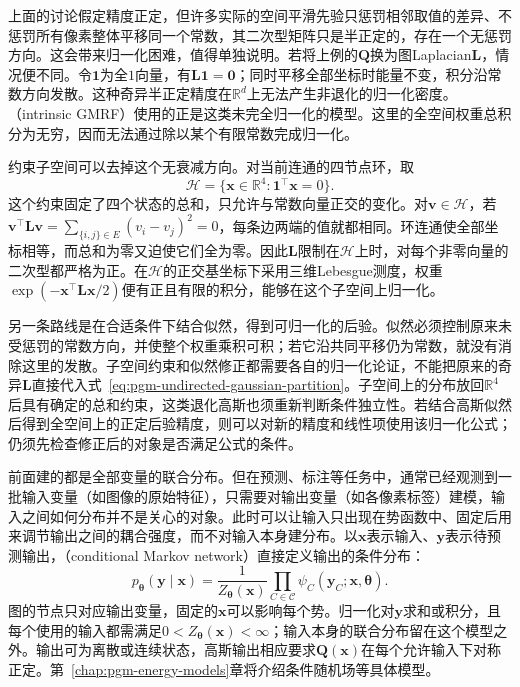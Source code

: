 上面的讨论假定精度正定，但许多实际的空间平滑先验只惩罚相邻取值的差异、不惩罚所有像素整体平移同一个常数，其二次型矩阵只是半正定的，存在一个无惩罚方向。这会带来归一化困难，值得单独说明。若将上例的$\bm{Q}$换为图Laplacian$\bm{L}$，情况便不同。令$\bm{1}$为全$1$向量，有$\bm{L}\bm{1}=\bm{0}$；同时平移全部坐标时能量不变，积分沿常数方向发散。这种奇异半正定精度在$\mathbb{R}^d$上无法产生非退化的归一化密度。（intrinsic GMRF）使用的正是这类未完全归一化的模型。这里的全空间权重总积分为无穷，因而无法通过除以某个有限常数完成归一化。

约束子空间可以去掉这个无衰减方向。对当前连通的四节点环，取
\[
  \mathcal H=\{\bm{x}\in\mathbb{R}^4:
                    \bm{1}^{\top}\bm{x}=0\}.
\]
这个约束固定了四个状态的总和，只允许与常数向量正交的变化。对$\bm{v}\in\mathcal H$，若$\bm{v}^{\top}\bm{L}\bm{v}=\sum_{\{i,j\}\in E}(v_i-v_j)^2=0$，每条边两端的值就都相同。环连通使全部坐标相等，而总和为零又迫使它们全为零。因此$\bm{L}$限制在$\mathcal H$上时，对每个非零向量的二次型都严格为正。在$\mathcal H$的正交基坐标下采用三维Lebesgue测度，权重$\exp(-\bm{x}^{\top}\bm{L}\bm{x}/2)$便有正且有限的积分，能够在这个子空间上归一化。

另一条路线是在合适条件下结合似然，得到可归一化的后验。似然必须控制原来未受惩罚的常数方向，并使整个权重乘积可积；若它沿共同平移仍为常数，就没有消除这里的发散。子空间约束和似然修正都需要各自的归一化论证，不能把原来的奇异$\bm{L}$直接代入式~\eqref{eq:pgm-undirected-gaussian-partition}。子空间上的分布放回$\mathbb{R}^4$后具有确定的总和约束，这类退化高斯也须重新判断条件独立性。若结合高斯似然后得到全空间上的正定后验精度，则可以对新的精度和线性项使用该归一化公式；仍须先检查修正后的对象是否满足公式的条件。

前面建的都是全部变量的联合分布。但在预测、标注等任务中，通常已经观测到一批输入变量（如图像的原始特征），只需要对输出变量（如各像素标签）建模，输入之间如何分布并不是关心的对象。此时可以让输入只出现在势函数中、固定后用来调节输出之间的耦合强度，而不对输入本身建分布。以$\bm{x}$表示输入、$\bm{y}$表示待预测输出，（conditional Markov network）直接定义输出的条件分布：
\begin{equation}
  p_{\bm{\theta}}(\bm{y}\mid\bm{x})
  =\frac{1}{Z_{\bm{\theta}}(\bm{x})}
    \prod_{C\in\mathcal{C}}
    \psi_C(\bm{y}_C;\bm{x},\bm{\theta}).
  \label{eq:pgm-undirected-conditional-network}
\end{equation}
图的节点只对应输出变量，固定的$\bm{x}$可以影响每个势。归一化对$\bm{y}$求和或积分，且每个使用的输入都需满足$0<Z_{\bm{\theta}}(\bm{x})<\infty$；输入本身的联合分布留在这个模型之外。输出可为离散或连续状态，高斯输出相应要求$\bm{Q}(\bm{x})$在每个允许输入下对称正定。第~\ref{chap:pgm-energy-models}章将介绍条件随机场等具体模型。

